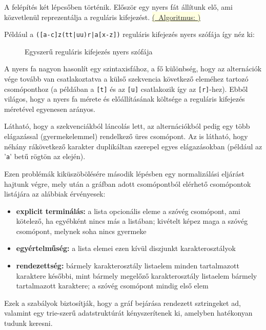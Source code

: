 \documentclass[
    parspace,
    noindent,
    nohyp,
]{elteiktdk}[2023/04/10]
\newcommand{\algorithmref}[1]{\hyperref[algorithm:#1]{\colorbox{lightyellow}{%
(\textrightarrow~Algoritmus: \nameref*{algorithm:#1})}}}
\begin{document}
A felépítés két lépcsőben történik.
Először egy nyers fát állítunk elő, ami közvetlenül reprezentálja a reguláris kifejezést.
\algorithmref{regex_wordtree_create_raw}

Például a \texttt{([a-c]z(tt|uu)r|a[x-z])} reguláris kifejezés nyers szófája így néz ki:

\begin{figure}[H]
\centering

\caption{Egyszerű reguláris kifejezés nyers szófája}
\end{figure}

A nyers fa nagyon hasonlít egy szintaxisfához,
a fő különbség, hogy az alternációk vége tovább van csatlakoztatva a külső szekvencia
következő eleméhez tartozó csomóponthoz
(a példában a \texttt{[t]} és az \texttt{[u]} csatlakozik így az \texttt{[r]}-hez).
Ebből világos, hogy a nyers fa mérete és előállításának költsége
a reguláris kifejezés méretével egyenesen arányos.

Látható, hogy a szekvenciákból láncolás lett,
az alternációkból pedig egy több elágazással (gyermekelemmel) rendelkező üres csomópont.
Az is látható, hogy néhány rákövetkező karakter duplikáltan szerepel egyes elágazásokban
(például az '\texttt{a}' betű rögtön az elején).

Ezen problémák kiküszöbölésére második lépésben egy normalizálási eljárást hajtunk végre,
mely után a gráfban adott csomópontból elérhető csomópontok listájára az alábbiak érvényesek:

\begin{itemize}
    \item \textbf{explicit terminálás:} a lista opcionális eleme a szóvég csomópont, ami kötelező, ha egyébként nincs más a listában; kivételt képez maga a szóvég csomópont, melynek soha nincs gyermeke
    \item \textbf{egyértelműség:} a lista elemei ezen kívül diszjunkt karakterosztályok
    \item \textbf{rendezettség:} bármely karakterosztály listaelem minden tartalmazott karaktere későbbi, mint bármely megelőző karakterosztály listaelem bármely tartalmazott karaktere; a szóvég csomópont mindig első elem
\end{itemize}

Ezek a szabályok biztosítják, hogy a gráf bejárása rendezett sztringeket ad,
valamint egy trie-szerű adatstruktúrát kényszerítenek ki, amelyben hatékonyan tudunk keresni.
\end{document}
